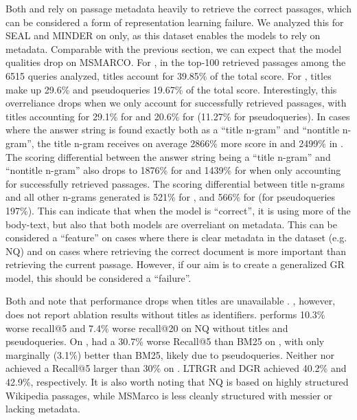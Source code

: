 Both  and  rely on passage metadata heavily to retrieve the correct passages, which can be considered a form of representation learning failure. We analyzed this for SEAL and MINDER on  only, as this dataset enables the models to rely on metadata. Comparable with the previous section, we can expect that the model qualities drop on MSMARCO. For , in the top-100 retrieved passages among the 6515 queries analyzed, titles account for 39.85\% of the total score. For , titles make up 29.6\% and pseudoqueries 19.67\% of the total score. Interestingly, this overreliance drops when we only account for successfully retrieved passages, with titles accounting for 29.1\% for  and 20.6\% for (11.27\% for pseudoqueries). In cases where the answer string is found exactly both as a ``title n-gram'' and ``nontitle n-gram'', the title n-gram receives on average 2866\% more score in  and 2499\% in . The scoring differential between the answer string being a ``title n-gram'' and ``nontitle n-gram'' also drops to 1876\% for  and 1439\% for  when only accounting for successfully retrieved passages. The scoring differential between title n-grams and all other n-grams generated is 521\% for , and 566\% for  (for pseudoqueries 197\%). This can indicate that when the model is ``correct'', it is using more of the body-text, but also that both models are overreliant on metadata. This can be considered a ``feature'' on cases where there is clear metadata in the dataset (e.g. NQ) and on cases where retrieving the correct document is more important than retrieving the current passage. However, if our aim is to create a generalized GR model, this should be considered a ``failure''.

Both \citet{michele-bevilacqua-autoregressive-search} and \citet{yongqi-li-multiview-identifiers,yongqi-li-learning-to,li-distillation-enhanced} note that performance drops when titles are unavailable \cite{michele-bevilacqua-autoregressive-search,yongqi-li-multiview-identifiers,yongqi-li-learning-to,li-distillation-enhanced}. \citet{michele-bevilacqua-autoregressive-search}, however, does not report  ablation results without titles as identifiers.  performs 10.3\% worse recall@5 and 7.4\% worse recall@20 on NQ without titles and pseudoqueries. On  \cite{payal-bajaj-ms-marco},  had a 30.7\% worse Recall@5 than BM25 on , with  only marginally (3.1\%) better than BM25, likely due to pseudoqueries. Neither  nor  achieved a Recall@5 larger than 30\% on . LTRGR and DGR achieved 40.2\% and 42.9\%, respectively. It is also worth noting that NQ is based on highly structured Wikipedia passages, while MSMarco is less cleanly structured with messier or lacking metadata.

